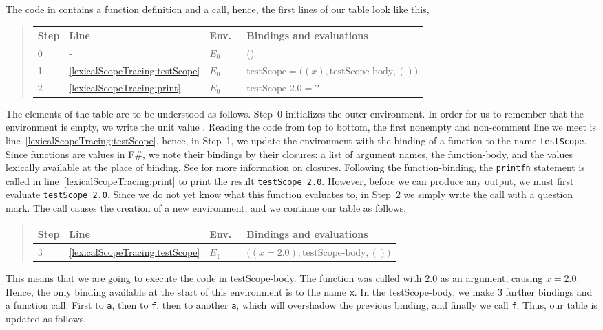 \documentclass[fsharpNotes.tex]{subfiles}
\begin{document}
The code in  contains a function definition and a call, hence, the first lines of our table look like this,
\begin{quote}
  \begin{tabular*}{0.9\linewidth}{l|lll}
    Step & Line & Env.\ & Bindings and evaluations\\
    \hline
    0 & - & $E_0$ & ()\\
    1 &\ref{lexicalScopeTracing:testScope} & $E_0$ & $\text{testScope} = \big((x), \text{testScope-body}, ()\big)$\\
    2 &\ref{lexicalScopeTracing:print} & $E_0$ & $\text{testScope } 2.0 = \text{?}$
  \end{tabular*}
\end{quote}
The elements of the table are to be understood as follows. Step~0 initializes the outer environment. In order for us to remember that the environment is empty, we write the unit value \lexeme{()}. Reading the code from top to bottom, the first nonempty and non-comment line we meet is line~\ref{lexicalScopeTracing:testScope}, hence, in Step~1, we update the environment with the binding of a function to the name \lstinline{testScope}. Since functions are values in F\#, we note their bindings by their closures: a list of argument names, the function-body, and the values lexically available at the place of binding. See  for more information on closures. Following the function-binding, the \lstinline{printfn} statement is called in line~\ref{lexicalScopeTracing:print} to print the result \lstinline{testScope 2.0}. However, before we can produce any output, we must first evaluate \lstinline{testScope 2.0}. Since we do not yet know what this function evaluates to, in Step~2 we simply write the call with a question mark. The call causes the creation of a new environment, and we continue our table as follows,
\begin{quote}
  \begin{tabular*}{0.9\linewidth}{l|lll}
    Step & Line & Env.\ & Bindings and evaluations\\
    \hline
    3 & \ref{lexicalScopeTracing:testScope} & $E_1$ & $\big((x=2.0), \text{testScope-body}, ()\big)$
  \end{tabular*}
\end{quote}
This means that we are going to execute the code in testScope-body. The function was called with $2.0$ as an argument, causing $x=2.0$. Hence, the only binding available at the start of this environment is to the name \lstinline{x}. In the testScope-body, we make 3 further bindings and a function call. First to \lstinline{a}, then to \lstinline{f}, then to another \lstinline{a}, which will overshadow the previous binding, and finally we call \lstinline{f}. Thus, our table is updated as follows,
\end{document}
